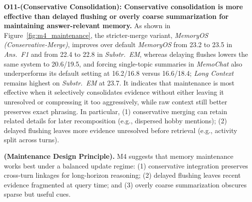 \documentclass{llmxive}
\begin{document}
\begin{sloppypar}
\noindent \textbf{O11-(Conservative Consolidation): Conservative consolidation is more effective than delayed flushing or overly coarse summarization for maintaining answer-relevant memory.}
As shown in Figure~\ref{fig:m4_maintenance}, the stricter-merge variant, \textit{MemoryOS (Conservative-Merge)}, improves over default \textit{MemoryOS} from 23.2 to 23.5 in \textit{Ans.\ F1} and from 22.4 to 22.8 in \textit{Substr.\ EM}, whereas delaying flushes lowers the same system to 20.6/19.5, and forcing single-topic summaries in \textit{MemoChat} also underperforms its default setting at 16.2/16.8 versus 16.6/18.4; \textit{Long Context} remains highest on \textit{Substr.\ EM} at 23.7.
It indicates that maintenance is most effective when it selectively consolidates evidence without either leaving it unresolved or compressing it too aggressively, while raw context still better preserves exact phrasing.
In particular, (1) conservative merging can retain related details for later recomposition (e.g., dispersed hobby mentions);
(2) delayed flushing leaves more evidence unresolved before retrieval (e.g., activity split across turns).
\end{sloppypar}

\begin{findingbox}
\textbf{(Maintenance Design Principle).} M4 suggests that memory maintenance works best under a balanced update regime: 
(1) conservative integration preserves cross-turn linkages for long-horizon reasoning; 
(2) delayed flushing leaves recent evidence fragmented at query time; 
and (3) overly coarse summarization obscures sparse but useful cues.
\end{findingbox}
\end{document}
